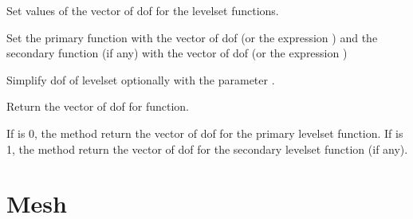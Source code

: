 \documentclass[a4paper,11pt,english]{sphinxmanual}
\begin{document}
\begin{fulllineitems}
\begin{fulllineitems}
Set values of the vector of dof for the level\sphinxhyphen{}set functions.

Set the primary function with the vector of dof  (or the expression
) and the secondary function (if any) with  the vector of dof
 (or the expression )

\end{fulllineitems}


\begin{fulllineitems}
\label{\detokenize{python/cmdref_LevelSet:getfem.LevelSet.simplify}}
Simplify dof of level\sphinxhyphen{}set optionally with the parameter .

\end{fulllineitems}


\begin{fulllineitems}
\label{\detokenize{python/cmdref_LevelSet:getfem.LevelSet.values}}
Return the vector of dof for  function.

If  is 0, the method return the vector of dof for the primary
level\sphinxhyphen{}set function. If  is 1, the method return the vector of
dof for the secondary level\sphinxhyphen{}set function (if any).

\end{fulllineitems}


\end{fulllineitems}



\section{Mesh}
\label{\detokenize{python/cmdref_Mesh:mesh}}\label{\detokenize{python/cmdref_Mesh::doc}}
\end{document}
